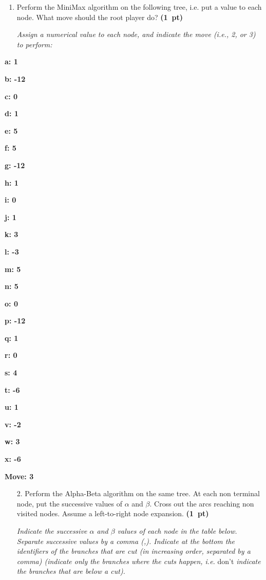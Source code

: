 \documentclass[11pt,a4paper]{report}
\begin{document}
\begin{enumerate}
\item Perform the MiniMax algorithm on the following tree, i.e.
      put a value to each node. What move should the root player do? \textbf{(1~pt)}
      
      \textit{Assign a numerical value to each node, and indicate the move (i.e., 2, or 3) to perform:}
\end{enumerate}
      \begin{answers}[3cm]
      \begin{multicols}{5}
      \textbf{a: 1} 

      \textbf{b: -12} 
      
      \textbf{c: 0} 
      
      \textbf{d: 1}
      
      \textbf{e: 5}
      
      \textbf{f: 5}
      
      \textbf{g: -12}
      
      \textbf{h: 1}
      
      \textbf{i: 0}
      
      \textbf{j: 1}
      
      \textbf{k: 3}
      
      \textbf{l: -3}
      
      \textbf{m: 5}
      
      \textbf{n: 5}
      
      \textbf{o: 0}
      
      \textbf{p: -12}
      
      \textbf{q: 1}
      
      \textbf{r: 0}
      
      \textbf{s: 4}
      
      \textbf{t: -6}
      
      \textbf{u: 1}
      
      \textbf{v: -2}
      
      \textbf{w: 3}
      
      \textbf{x: -6}
      
      \textbf{Move: 3}
      \end{multicols}
	  \end{answers}



\begin{enumerate}
\item[2.] Perform the Alpha-Beta algorithm on the same tree.
      At each non terminal node, put the successive values of $\alpha$ and
      $\beta$. Cross out the arcs reaching non visited nodes. Assume a
      left-to-right node expansion. \textbf{(1~pt)}
      
      \textit{Indicate the successive $\alpha$ and $\beta$ values of each node in the table below. Separate successive values by a comma (,). Indicate at the bottom the identifiers of the branches that are cut (in increasing order, separated by a comma) (indicate only the branches where the cuts happen, i.e.\!} don't \textit{indicate the branches that are below a cut).}
\end{enumerate}
\end{document}
